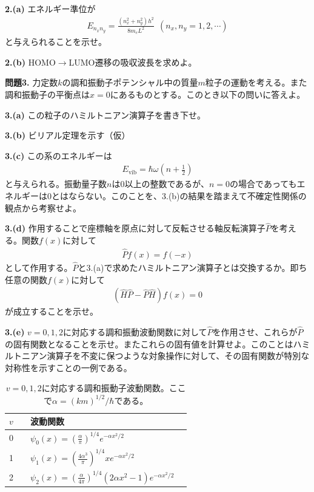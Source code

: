 \documentclass[12pt,pra,aps]{revtex4}
\begin{document}
\noindent
{\bf 2.(a)} エネルギー準位が
\begin{align}
  E_{n_x n_y} = \frac{(n_x^2+n_y^2)h^2}{8m_eL^2}\ \ (n_x,n_y=1,2,\cdots)
\end{align}
と与えられることを示せ。

\noindent
{\bf 2.(b)} HOMO$\rightarrow$LUMO遷移の吸収波長を求めよ。

\vspace{2cm}
\noindent
{\bf 問題3.} 力定数$k$の調和振動子ポテンシャル中の質量$m$粒子の運動を考える。また調和振動子の平衡点は$x=0$にあるものとする。このとき以下の問いに答えよ。

\noindent
{\bf 3.(a)} この粒子のハミルトニアン演算子を書き下せ。

\noindent
{\bf 3.(b)} ビリアル定理を示す（仮）

\noindent
{\bf 3.(c)} この系のエネルギーは
%    
\begin{align}
  E_\text{vib}=\hbar \omega\left(n+\frac{1}{2}\right)
\end{align}
%
と与えられる。振動量子数$n$は0以上の整数であるが、$n=0$の場合であってもエネルギーは0とはならない。このことを、3.(b)の結果を踏まえて不確定性関係の観点から考察せよ。

\noindent
{\bf 3.(d)} 作用することで座標軸を原点に対して反転させる軸反転演算子$\hat{P}$を考える。関数$f(x)$に対して
\begin{align}
  \hat{P}f(x)=f(-x)
\end{align}
として作用する。$\hat{P}$と3.(a)で求めたハミルトニアン演算子とは交換するか。即ち任意の関数$f(x)$に対して
\begin{align}
  (\hat{H}\hat{P}-\hat{P}\hat{H})f(x)=0
\end{align}
が成立することを示せ。

\noindent
{\bf 3.(e)} $v=0,1,2$に対応する調和振動波動関数に対して$\hat{P}$を作用させ、これらが$\hat{P}$の固有関数となることを示せ。またこれらの固有値を計算せよ。このことはハミルトニアン演算子を不変に保つような対象操作に対して、その固有関数が特別な対称性を示すことの一例である。

\begin{table}[h]
\caption{\label{tab:chowa}
$v=0,1,2$に対応する調和振動子波動関数。ここで$\alpha=(km)^{1/2}/\hbar$である。
}
\begin{tabular}{llll}
  \hline\hline  
  $v$          && 波動関数 \\
  \hline
  0 && $\psi_0(x)=\left(\frac{\alpha}{\pi}\right)^{1/4}e^{-\alpha x^2/2}$ \\
  1 && $\psi_1(x)=\left(\frac{4\alpha^3}{\pi}\right)^{1/4}xe^{-\alpha x^2/2}$ \\
  2 && $\psi_2(x)=\left(\frac{\alpha}{4\pi}\right)^{1/4}(2\alpha x^2-1)e^{-\alpha x^2/2}$ \\
  \hline\hline  
\end{tabular}
\end{table}
\end{document}
